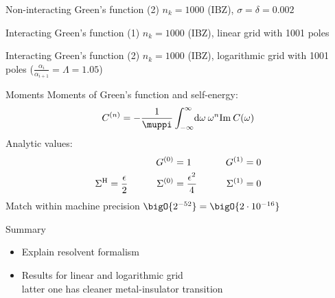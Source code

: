\documentclass[aspectratio=169]{beamer}
\begin{document}
\begin{frame}{Non-interacting Green's function (2)}
    $n_k = 1000$ (IBZ), $\sigma = \delta = 0.002$

    \begin{centering}
        
    \end{centering}
\end{frame}

\begin{frame}{Interacting Green's function (1)}
    $n_k = 1000$ (IBZ), linear grid with 1001 poles

    \begin{centering}
        
    \end{centering}
\end{frame}

\begin{frame}{Interacting Green's function (2)}
    $n_k = 1000$ (IBZ), logarithmic grid with 1001 poles ($\frac{\alpha_i}{\alpha_{i+1}} = \Lambda = 1.05$)

    \begin{centering}
        
    \end{centering}
\end{frame}

\begin{frame}{Moments}
    Moments of Green's function and self-energy:
    \begin{equation}
        C^{(n)} = -\frac{1}{\muppi} \int_{-\infty}^\infty\! \md\omega\> \omega^n \Im C(\omega)
    \end{equation}
    Analytic values:
    \begin{alignat}{3}
                   &                      & G^{(0)}             & = 1                    & \qquad G^{(1)}      & = 0 \\
        \Sigma^{\mathrm{H}} & = \frac{\epsilon}{2} & \qquad \Sigma^{(0)} & = \frac{\epsilon^2}{4} & \qquad \Sigma^{(1)} & = 0
    \end{alignat}
    Match within machine precision $\bigO{2^{-52}}=\bigO{2\cdot10^{-16}}$
\end{frame}

\begin{frame}{Summary}
    \begin{itemize}
        \item Explain resolvent formalism
        \item Results for linear and logarithmic grid \\
              latter one has cleaner metal-insulator transition
    \end{itemize}
\end{frame}
\end{document}
